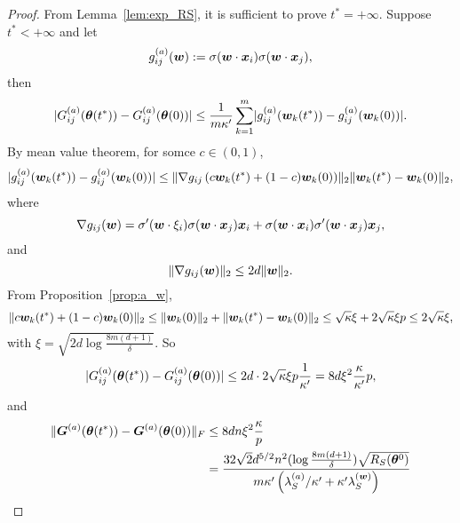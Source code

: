 \documentclass{article}
\begin{document}
\begin{proof}
    From Lemma~\ref{lem:exp_RS}, it is sufficient to prove $t^* = +\infty$. Suppose $t^* < +\infty$ and let
    \begin{equation}
        g^{(a)}_{ij}(\bm{w}) := \sigma(\bm{w}\cdot\bm{x}_i)\sigma(\bm{w}\cdot\bm{x}_j),
    \end{equation}
    then
    \begin{equation}
        \lvert G_{ij}^{(a)}(\bm{\theta}(t^*)) - G_{ij}^{(a)}(\bm{\theta}(0))\rvert \leq \frac{1}{m\kappa'}\sum_{k=1}^m \lvert g^{(a)}_{ij}(\bm{w}_k(t^*)) - g^{(a)}_{ij}(\bm{w}_k(0))\rvert.
    \end{equation}
    By mean value theorem, for somce $c\in(0,1)$,
    \begin{equation}
        \lvert g^{(a)}_{ij}(\bm{w}_k(t^*)) - g^{(a)}_{ij}(\bm{w}_k(0))\rvert \leq \lVert\nabla g_{ij}\left(c\bm{w}_k(t^*) + (1-c)\bm{w}_k(0)\right)\rVert_2\lVert\bm{w}_k(t^*) - \bm{w}_k(0)\rVert_2,
    \end{equation}
    where
    \begin{equation}
        \nabla g_{ij}(\bm{w})=\sigma'(\bm{w}\cdot\xi_i)\sigma(\bm{w}\cdot\bm{x}_j)\bm{x}_i+\sigma(\bm{w}\cdot\bm{x}_i)\sigma'(\bm{w}\cdot\bm{x}_j)\bm{x}_j,
    \end{equation}
    and
    \begin{equation}
        \lVert\nabla g_{ij}(\bm{w})\rVert_2\leq 2d\lVert\bm{w}\rVert_2.
    \end{equation}
    From Proposition~\ref{prop:a_w},
    \begin{equation}
        \lVert c\bm{w}_k(t^*) + (1-c)\bm{w}_k(0)\rVert_2 \leq \lVert\bm{w}_k(0)\rVert_2 + \lVert\bm{w}_k(t^*) - \bm{w}_k(0)\rVert_2 \leq \sqrt{\kappa}\xi + 2\sqrt{\kappa}\xi p \leq 2\sqrt{\kappa}\xi,
    \end{equation}
    with $\xi = \sqrt{2d\log\frac{8m(d+1)}{\delta}}$. So
    \begin{equation}
        \lvert G_{ij}^{(a)}(\bm{\theta}(t^*)) - G_{ij}^{(a)}(\bm{\theta}(0))\rvert \leq 2d\cdot 2\sqrt{\kappa}\xi p \frac{1}{\kappa'} = 8d\xi^2\frac{\kappa}{\kappa'}p,
    \end{equation}
    and
    \begin{equation}
        \begin{aligned}
            \norm{\mG^{(a)}(\vtheta(t^*)) - \mG^{(a)}(\vtheta(0))}_F
             & \leq 8dn\xi^2\frac{\kappa}p                                                                                                                           \\
             & = \frac{32\sqrt{2}d^{5/2}n^2(\log\frac{8m(d+1)}{\delta})\sqrt{\RS(\vtheta^0)}}{m\kappa'\left(\lambda_S^{(a)}/\kappa'+\kappa'\lambda_S^{(\vw)}\right)} \\

\end{aligned}
\end{equation}
\end{proof}
\end{document}

